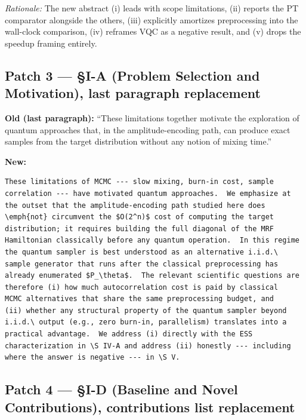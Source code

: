 \noindent\emph{Rationale:} The new abstract (i) leads with scope
limitations, (ii) reports the PT comparator alongside the others, (iii)
explicitly amortizes preprocessing into the wall-clock comparison, (iv)
reframes VQC as a negative result, and (v) drops the speedup framing
entirely.

\subsection*{Patch 3 --- \S I-A (Problem Selection and Motivation),
last paragraph replacement}

\textbf{Old (last paragraph):} ``These limitations together motivate the
exploration of quantum approaches that, in the amplitude-encoding path, can
produce exact samples from the target distribution without any notion of
mixing time.''

\noindent\textbf{New:}

\begin{verbatim}
These limitations of MCMC --- slow mixing, burn-in cost, sample
correlation --- have motivated quantum approaches.  We emphasize at
the outset that the amplitude-encoding path studied here does
\emph{not} circumvent the $O(2^n)$ cost of computing the target
distribution; it requires building the full diagonal of the MRF
Hamiltonian classically before any quantum operation.  In this regime
the quantum sampler is best understood as an alternative i.i.d.\
sample generator that runs after the classical preprocessing has
already enumerated $P_\theta$.  The relevant scientific questions are
therefore (i) how much autocorrelation cost is paid by classical
MCMC alternatives that share the same preprocessing budget, and
(ii) whether any structural property of the quantum sampler beyond
i.i.d.\ output (e.g., zero burn-in, parallelism) translates into a
practical advantage.  We address (i) directly with the ESS
characterization in \S IV-A and address (ii) honestly --- including
where the answer is negative --- in \S V.
\end{verbatim}

\subsection*{Patch 4 --- \S I-D (Baseline and Novel Contributions),
contributions list replacement}

